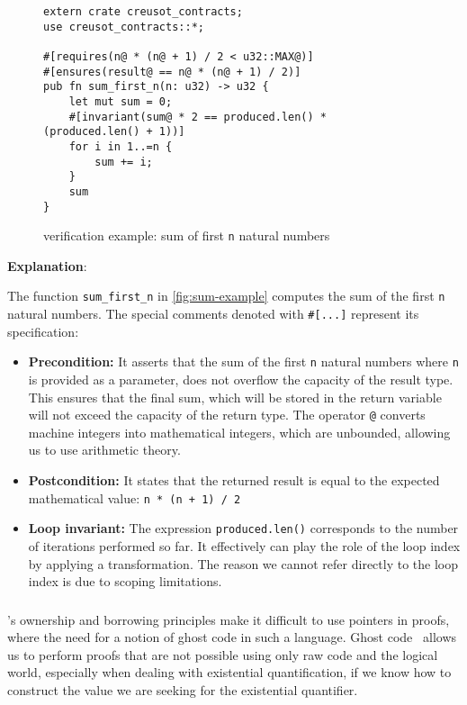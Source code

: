 \documentclass[11pt,a4paper]{article}
\begin{document}
\begin{figure}[tp]
\centering
\begin{minipage}{0.95\linewidth}
\begin{verbatim}
extern crate creusot_contracts;
use creusot_contracts::*;

#[requires(n@ * (n@ + 1) / 2 < u32::MAX@)]
#[ensures(result@ == n@ * (n@ + 1) / 2)]
pub fn sum_first_n(n: u32) -> u32 {
    let mut sum = 0;
    #[invariant(sum@ * 2 == produced.len() * (produced.len() + 1))]
    for i in 1..=n {
        sum += i;
    }
    sum
}
\end{verbatim}
\caption{\creusot{} verification example: sum of first \texttt{n} natural numbers}
\label{fig:sum-example}
\end{minipage}
\end{figure}

\textbf{Explanation}: 

The function \texttt{sum\_first\_n} in \autoref{fig:sum-example} computes the sum of the first \texttt{n} natural numbers. The special comments denoted with \texttt{\#[...]} represent its specification:
\begin{itemize}
\item \textbf{Precondition:} It asserts that the sum of the first \texttt{n} natural numbers where \texttt{n} is provided as a parameter, does not overflow the capacity of the result type. This ensures that the final sum, which will be stored in the return variable will not exceed the capacity of the return type. The operator \texttt{@} converts machine integers into mathematical integers, which are unbounded, allowing us to use arithmetic theory.
\item \textbf{Postcondition:} It states that the returned result is equal to the expected mathematical value: \texttt{n * (n + 1) / 2}
\item \textbf{Loop invariant:} The expression \texttt{produced.len()} corresponds to the number of iterations performed so far. It effectively can play the role of the loop index by applying a transformation. The reason we cannot refer directly to the loop index is due to scoping limitations.
\end{itemize}
\subsubsection{}
\rust{}'s ownership and borrowing principles make it difficult to use pointers in proofs, where the need for a notion of ghost code in such a language. Ghost code~\cite{jcfand} allows us to perform proofs that are not possible using only raw code and the logical world, especially when dealing with existential quantification, if we know how to construct the value we are seeking for the existential quantifier.
\end{document}
